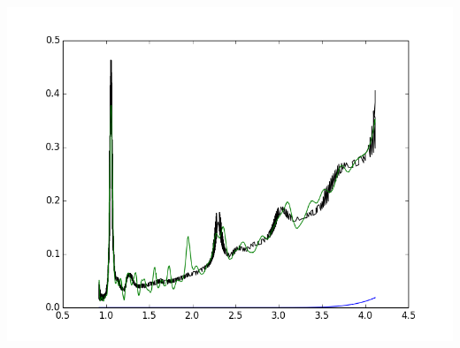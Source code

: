 \documentclass{article}
\begin{document}
\includegraphics{"(10,0) ATPE DNA Paper.png"}
\end{document}
